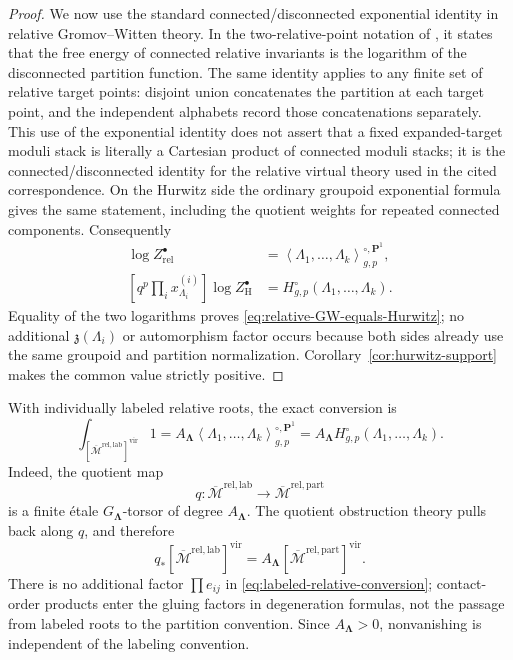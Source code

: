 \documentclass[10pt,a4paper]{amsart}
\numberwithin{equation}{section}
\begin{document}
\begin{proof}
We now use the standard connected/disconnected exponential identity in
relative Gromov--Witten theory.  In the two-relative-point notation of
\cite[equations~(4.1)--(4.2)]{OkounkovPandharipande}, it states that the
free energy of connected relative invariants is the logarithm of the
disconnected partition function.  The same identity applies to any finite
set of relative target points: disjoint union concatenates the partition
at each target point, and the independent alphabets record those
concatenations separately.  This use of the exponential identity does not
assert that a fixed expanded-target moduli stack is literally a Cartesian
product of connected moduli stacks; it is the connected/disconnected
identity for the relative virtual theory used in the cited correspondence.
On the Hurwitz side the ordinary groupoid exponential formula gives the
same statement, including the quotient weights for repeated connected
components.  Consequently
\begin{align*}
 [q^p\prod_i x^{(i)}_{\Lambda_i}]
 \log Z^\bullet_{\mathrm{rel}}
 &=\left\langle\Lambda_1,\ldots,\Lambda_k
   \right\rangle^{\circ,\mathbf P^1}_{g,p},\\
 [q^p\prod_i x^{(i)}_{\Lambda_i}]
 \log Z^\bullet_{\mathrm H}
 &=H^\circ_{g,p}(\Lambda_1,\ldots,\Lambda_k).
\end{align*}
Equality of the two logarithms proves
\eqref{eq:relative-GW-equals-Hurwitz}; no additional
$\mathfrak z(\Lambda_i)$ or automorphism factor occurs because both sides
already use the same groupoid and partition normalization.
Corollary~\ref{cor:hurwitz-support} makes the common value strictly
positive.
\end{proof}

With individually labeled relative roots, the exact conversion is
\begin{equation}\label{eq:labeled-relative-conversion}
 \int_{[\overline{\mathcal M}^{\mathrm{rel,lab}}]^{\mathrm{vir}}}1
 =A_{\boldsymbol\Lambda}
  \left\langle\Lambda_1,\ldots,\Lambda_k
  \right\rangle^{\circ,\mathbf P^1}_{g,p}
 =A_{\boldsymbol\Lambda}
  H^\circ_{g,p}(\Lambda_1,\ldots,\Lambda_k).
\end{equation}
Indeed, the quotient map
\[
 q:\overline{\mathcal M}^{\mathrm{rel,lab}}
 \longrightarrow\overline{\mathcal M}^{\mathrm{rel,part}}
\]
is a finite \'etale $G_{\boldsymbol\Lambda}$-torsor of degree
$A_{\boldsymbol\Lambda}$.  The quotient obstruction theory pulls back
along $q$, and therefore
\[
 q_*[\overline{\mathcal M}^{\mathrm{rel,lab}}]^{\mathrm{vir}}
 =A_{\boldsymbol\Lambda}
 [\overline{\mathcal M}^{\mathrm{rel,part}}]^{\mathrm{vir}}.
\]
There is no additional factor $\prod e_{ij}$ in
\eqref{eq:labeled-relative-conversion}; contact-order products enter the
gluing factors in degeneration formulas, not the passage from labeled
roots to the partition convention.  Since
$A_{\boldsymbol\Lambda}>0$, nonvanishing is independent of the labeling
convention.
\end{document}
